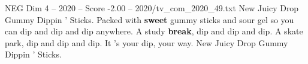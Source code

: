 \begin{textsample}{NEG Dim 4 – 2020 – Score -2.00 – 2020/tv\_com\_2020\_49.txt}  \label{ex:f4_neg_061}
New Juicy Drop Gummy Dippin ' Sticks.
Packed with \textbf{sweet} gummy sticks and sour gel so you can dip and dip and dip anywhere.
A study \textbf{break}, dip and dip and dip.
A skate park, dip and dip and dip.
It 's your dip, your way.
New Juicy Drop Gummy Dippin ' Sticks.

\end{textsample}
